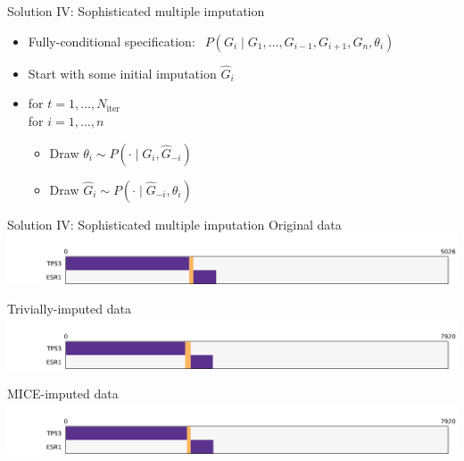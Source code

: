 \documentclass[mathserif]{beamer}
\begin{document}
\begin{frame}{Solution IV: Sophisticated multiple imputation}
  \begin{itemize}
    \item<1-> Fully-conditional specification: $\ \ P(G_i \mid G_1, \ldots, G_{i-1}, G_{i+1}, G_n, \theta_i)$
    \vspace{1em}
    \item<2-> Start with some initial imputation $\hat{G}_i$
    \vspace{1em}
    \item<3-> for $t = 1,\ldots,N_{\textrm{iter}}$\\[0.2em]
          \hspace{0.9em}for $i = 1,\ldots, n$
    \vspace{0.5em}
    \begin{itemize}
    	\item Draw $\theta_i \sim P(\cdot \mid G_i, \hat{G}_{-i})$
    	\vspace{0.5em}
    	\item Draw $\hat{G}_i \sim P(\cdot \mid \hat{G}_{-i}, \theta_i)$
    \end{itemize}
  \end{itemize}
  \vspace{2em}
  
  
\end{frame}

\begin{frame}{Solution IV: Sophisticated multiple imputation}
  \centering
  Original data
  \includegraphics[width=\textwidth,trim={2cm 0 0 1cm},clip]{figures/group_orig_stretched.pdf}

  \vspace{2em}
  Trivially-imputed data
  \includegraphics[width=\textwidth,trim={2cm 0 0 1cm},clip]{figures/group_filled.pdf}
  
  \vspace{2em}
  MICE-imputed data
  \includegraphics[width=\textwidth,trim={2cm 0 0 1cm},clip]{figures/group_mice.pdf}
\end{frame}
\end{document}
